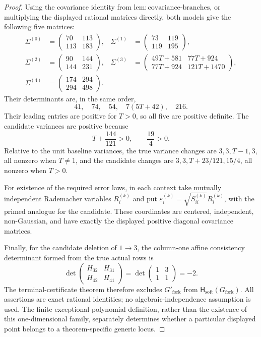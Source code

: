 \documentclass{article}
\begin{document}
\begin{proof}
Using the covariance identity from \(\mathrm{lem:covariance\text{-}branches}\), or multiplying the displayed rational matrices directly, both models give the following five matrices:
\[
 \begin{aligned}
 \Sigma^{(0)}&=\begin{pmatrix}70&113\\113&183\end{pmatrix},&
 \Sigma^{(1)}&=\begin{pmatrix}73&119\\119&195\end{pmatrix},\\
 \Sigma^{(2)}&=\begin{pmatrix}90&144\\144&231\end{pmatrix},&
 \Sigma^{(3)}&=\begin{pmatrix}49T+581&77T+924\\77T+924&121T+1470\end{pmatrix},\\
 \Sigma^{(4)}&=\begin{pmatrix}174&294\\294&498\end{pmatrix}.&&
 \end{aligned}
\]
Their determinants are, in the same order,
\[
 41,\quad 74,\quad 54,\quad 7(5T+42),\quad 216.
\]
Their leading entries are positive for \(T>0\), so all five are positive definite.  The candidate variances are positive because
\[
 T+\frac{144}{121}>0,
 \qquad \frac{19}{4}>0.
\]
Relative to the unit baseline variances, the true variance changes are \(3,3,T-1,3\), all nonzero when \(T\ne1\), and the candidate changes are \(3,3,T+23/121,15/4\), all nonzero when \(T>0\).

For existence of the required error laws, in each context take mutually independent Rademacher variables \(R_i^{(k)}\) and put \(\varepsilon_i^{(k)}=\sqrt{S^{(k)}_{ii}}R_i^{(k)}\), with the primed analogue for the candidate.  These coordinates are centered, independent, non-Gaussian, and have exactly the displayed positive diagonal covariance matrices.

Finally, for the candidate deletion of \(1\to3\), the column-one affine consistency determinant formed from the true actual rows is
\[
 \det\begin{pmatrix}H_{32}&H_{31}\\H_{42}&H_{41}\end{pmatrix}
 =\det\begin{pmatrix}1&3\\1&1\end{pmatrix}=-2.
\]
The terminal-certificate theorem therefore excludes \(G'_{\mathrm{fork}}\) from \(\mathsf H_{\mathrm{soft}}(G_{\mathrm{fork}})\).  All assertions are exact rational identities; no algebraic-independence assumption is used.  The finite exceptional-polynomial definition, rather than the existence of this one-dimensional family, separately determines whether a particular displayed point belongs to a theorem-specific generic locus.
\end{proof}
\end{document}
